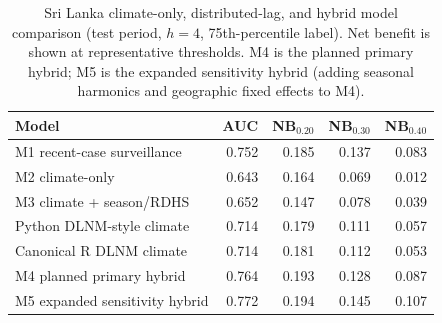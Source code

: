 \documentclass[11pt,a4paper]{article}
\begin{document}
\begin{table}[htbp]
\centering
\caption{Sri Lanka climate-only, distributed-lag, and hybrid model comparison (test period, $h=4$, 75th-percentile label). Net benefit is shown at representative thresholds. M4 is the planned primary hybrid; M5 is the expanded sensitivity hybrid (adding seasonal harmonics and geographic fixed effects to M4).}
\label{tab:dlnmhybrid}
\small
\begin{tabular}{lrrrr}
\toprule
Model & AUC & NB$_{0.20}$ & NB$_{0.30}$ & NB$_{0.40}$ \\
\midrule
M1 recent-case surveillance & 0.752 & 0.185 & 0.137 & 0.083 \\
M2 climate-only & 0.643 & 0.164 & 0.069 & 0.012 \\
M3 climate + season/RDHS & 0.652 & 0.147 & 0.078 & 0.039 \\
Python DLNM-style climate & 0.714 & 0.179 & 0.111 & 0.057 \\
Canonical R DLNM climate & 0.714 & 0.181 & 0.112 & 0.053 \\
M4 planned primary hybrid & 0.764 & 0.193 & 0.128 & 0.087 \\
M5 expanded sensitivity hybrid & 0.772 & 0.194 & 0.145 & 0.107 \\
\bottomrule
\end{tabular}
\end{table}
\end{document}
